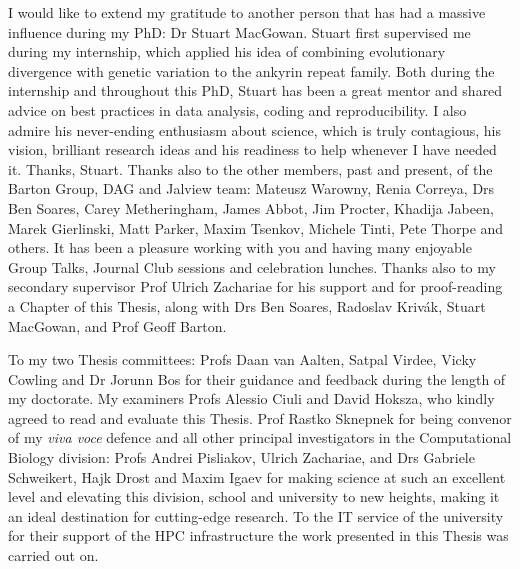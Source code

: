 I would like to extend my gratitude to another person that has had a massive influence during my PhD: Dr Stuart MacGowan. Stuart first supervised me during my internship, which applied his idea of combining evolutionary divergence with genetic variation to the ankyrin repeat family. Both during the internship and throughout this PhD, Stuart has been a great mentor and shared advice on best practices in data analysis, coding and reproducibility. I also admire his never-ending enthusiasm about science, which is truly contagious, his vision, brilliant research ideas and his readiness to help whenever I have needed it. Thanks, Stuart. Thanks also to the other members, past and present, of the Barton Group, DAG and Jalview team: Mateusz Warowny, Renia Correya, Drs Ben Soares, Carey Metheringham, James Abbot, Jim Procter, Khadija Jabeen, Marek Gierlinski, Matt Parker, Maxim Tsenkov, Michele Tinti, Pete Thorpe and others. It has been a pleasure working with you and having many enjoyable Group Talks, Journal Club sessions and celebration lunches. Thanks also to my secondary supervisor Prof Ulrich Zachariae for his support and for proof-reading a Chapter of this Thesis, along with Drs Ben Soares, Radoslav Krivák, Stuart MacGowan, and Prof Geoff Barton.

To my two Thesis committees: Profs Daan van Aalten, Satpal Virdee, Vicky Cowling and Dr Jorunn Bos for their guidance and feedback during the length of my doctorate. My examiners Profs Alessio Ciuli and David Hoksza, who kindly agreed to read and evaluate this Thesis. Prof Rastko Sknepnek for being convenor of my \textit{viva voce} defence and all other principal investigators in the Computational Biology division: Profs Andrei Pisliakov, Ulrich Zachariae, and Drs Gabriele Schweikert, Hajk Drost and Maxim Igaev for making science at such an excellent level and elevating this division, school and university to new heights, making it an ideal destination for cutting-edge research. To the IT service of the university for their support of the HPC infrastructure the work presented in this Thesis was carried out on.

